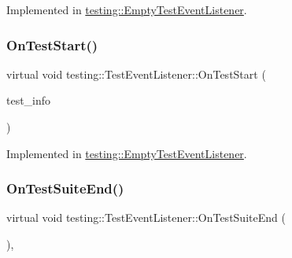 Implemented in \hyperlink{classtesting_1_1EmptyTestEventListener_ac3f5033fcd82080edb45f546ce9854fe}{testing\+::\+Empty\+Test\+Event\+Listener}.

\mbox{\label{classtesting_1_1TestEventListener_ab4f6a0ca16ae75daf385b3b5914e1048}} 
\subsubsection{\texorpdfstring{On\+Test\+Start()}{OnTestStart()}}
{\footnotesize\ttfamily virtual void testing\+::\+Test\+Event\+Listener\+::\+On\+Test\+Start (\begin{DoxyParamCaption}\item[{const \hyperlink{classtesting_1_1TestInfo}{Test\+Info} \&}]{test\+\_\+info }\end{DoxyParamCaption})\hspace{0.3cm}{\ttfamily [pure virtual]}}



Implemented in \hyperlink{classtesting_1_1EmptyTestEventListener_a1d8c7f3f1f92826f668edae1bc5aadf4}{testing\+::\+Empty\+Test\+Event\+Listener}.

\mbox{\label{classtesting_1_1TestEventListener_a8962caad5d2522c9160c794074a662ee}} 
\subsubsection{\texorpdfstring{On\+Test\+Suite\+End()}{OnTestSuiteEnd()}}
{\footnotesize\ttfamily virtual void testing\+::\+Test\+Event\+Listener\+::\+On\+Test\+Suite\+End (\begin{DoxyParamCaption}\item[{const \hyperlink{classtesting_1_1TestSuite}{Test\+Suite} \&}]{ }\end{DoxyParamCaption})\hspace{0.3cm}{\ttfamily [inline]}, {\ttfamily [virtual]}}




